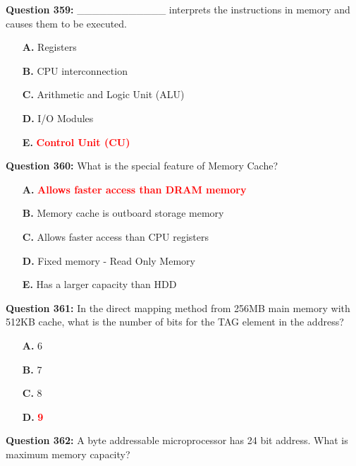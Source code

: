\documentclass[12pt,a4paper]{article}
\begin{document}
\vspace{0.5cm}

\textbf{Question 359:} ____________ interprets the instructions in memory and causes them to be executed.

\begin{itemize}
    \item[\textbf{A.}] Registers
    \item[\textbf{B.}] CPU interconnection
    \item[\textbf{C.}] Arithmetic and Logic Unit (ALU)
    \item[\textbf{D.}] I/O Modules
    \item[\textbf{E.}] \textcolor{red}{\textbf{Control Unit (CU)}}
\end{itemize}

\vspace{0.5cm}

\textbf{Question 360:} What is the special feature of Memory Cache?

\begin{itemize}
    \item[\textbf{A.}] \textcolor{red}{\textbf{Allows faster access than DRAM memory}}
    \item[\textbf{B.}] Memory cache is outboard storage memory
    \item[\textbf{C.}] Allows faster access than CPU registers
    \item[\textbf{D.}] Fixed memory - Read Only Memory
    \item[\textbf{E.}] Has a larger capacity than HDD
\end{itemize}

\vspace{0.5cm}

\textbf{Question 361:} In the direct mapping method from 256MB main memory with 512KB cache, what is the number of bits for the TAG element in the address?

\begin{itemize}
    \item[\textbf{A.}] 6
    \item[\textbf{B.}] 7
    \item[\textbf{C.}] 8
    \item[\textbf{D.}] \textcolor{red}{\textbf{9}}
\end{itemize}

\vspace{0.5cm}

\textbf{Question 362:} A byte addressable microprocessor has 24 bit address. What is maximum memory capacity?
\end{document}
